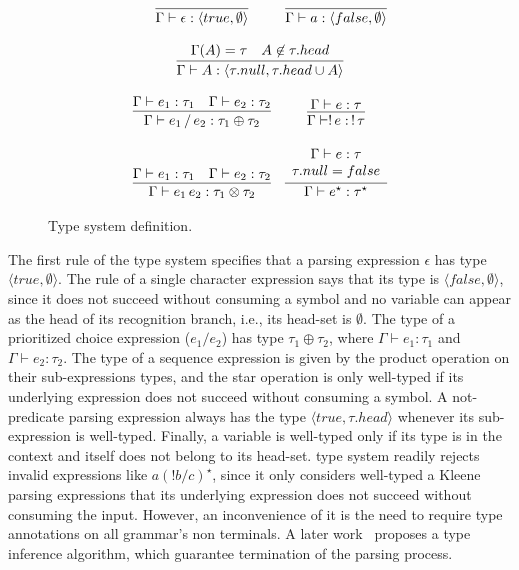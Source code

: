 \documentclass[sigplan,screen]{acmart}
\theoremstyle{definition}
\begin{document}
\begin{figure}[h!]
\[
  \begin{array}{cc}
    \infer{\Gamma \vdash \epsilon : \langle true , \emptyset \rangle}{} &
    \infer{\Gamma \vdash a : \langle false , \emptyset\rangle}{} \\ \\
    \multicolumn{2}{c}{
      \infer{\Gamma \vdash A : \langle \tau.null, \tau.head \cup {A}\rangle}
            {\Gamma(A) = \tau & A \not\in \tau.head}
    }\\ \\
    \infer{\Gamma\vdash e_1\,/\,e_2 : \tau_1 \oplus \tau_2}
          {\Gamma \vdash e_1 : \tau_1 & \Gamma \vdash e_2 : \tau_2}
    &
    \infer{\Gamma\vdash !\,e :\, !\,\tau}
          {\Gamma \vdash e : \tau}\\ \\
    \infer{\Gamma\vdash e_1\,e_2 : \tau_1 \otimes \tau_2}
          {\Gamma \vdash e_1 : \tau_1 & \Gamma \vdash e_2 : \tau_2} &
    \infer{\Gamma\vdash e^\star : \tau^\star}
          {\begin{array}{c}
             \Gamma \vdash e : \tau\\
             \tau.null = false\\
           \end{array}}
  \end{array}
\]
\centering
\caption{Type system definition.}
\label{fig:typesystem}
\end{figure}

The first rule of the type system specifies that a parsing
expression $\epsilon$ has type $\langle true, \emptyset \rangle$.
The rule of a single character expression says that its type is
$\langle false, \emptyset\rangle$, since it does not succeed without
consuming a symbol and no variable can appear as the head of its
recognition branch, i.e., its head-set is $\emptyset$. The type of a prioritized
choice expression ($e_1/e_2$) has type $\tau_1 \oplus \tau_2$,
where $\Gamma \vdash e_1 : \tau_1$ and $\Gamma \vdash e_2 : \tau_2$.
The type of a sequence expression is given by the product operation
on their sub-expressions types, and the star operation is only well-typed
if its underlying expression does not succeed without consuming
a symbol. A not-predicate parsing expression always has the type
$\langle true,\tau.head \rangle$ whenever its sub-expression is well-typed.
Finally, a variable is well-typed only if its type is in the context and
itself does not belong to its head-set.
\citet{Ribeiro19} type system readily rejects invalid expressions like
$a(!b / c)^\star$, since it only considers well-typed a Kleene parsing
expressions that its underlying expression does
not succeed without consuming the input. However, an inconvenience of it is
the need to require type annotations on all grammar's non terminals.
A later work~\cite{Cardoso23} proposes a type inference algorithm, which
guarantee termination of the parsing process.
\end{document}

